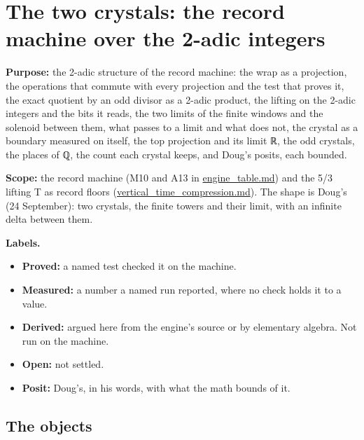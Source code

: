\chapter{\texorpdfstring{The two crystals: the record machine over the 2-adic integers}{The two crystals: the record machine over the 2-adic integers}}
\label{chap:two-crystals}

\textbf{Purpose:} the 2-adic structure of the record machine: the wrap as a projection, the operations that commute with every projection and the test that proves it, the exact quotient by an odd divisor as a 2-adic product, the lifting on the 2-adic integers and the bits it reads, the two limits of the finite windows and the solenoid between them, what passes to a limit and what does not, the crystal as a boundary measured on itself, the top projection and its limit ℝ, the odd crystals, the places of ℚ, the count each crystal keeps, and Doug's posits, each bounded.

\textbf{Scope:} the record machine (M10 and A13 in \hyperref[chap:engine-table]{engine\_\allowbreak{}table.md}) and the 5/3 lifting T as record floors (\hyperref[chap:vertical-time-compression]{vertical\_\allowbreak{}time\_\allowbreak{}compression.md}). The shape is Doug's (24 September): two crystals, the finite towers and their limit, with an infinite delta between them.

\textbf{Labels.}

\begin{itemize}
\item \textbf{Proved:} a named test checked it on the machine.
\item \textbf{Measured:} a number a named run reported, where no check holds it to a value.
\item \textbf{Derived:} argued here from the engine's source or by elementary algebra. Not run on the machine.
\item \textbf{Open:} not settled.
\item \textbf{Posit:} Doug's, in his words, with what the math bounds of it.
\end{itemize}

\section{\texorpdfstring{The objects}{The objects}}

